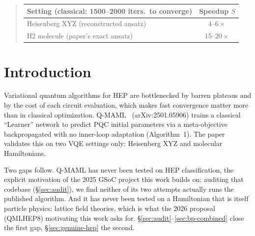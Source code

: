 \documentclass[11pt]{article}
\begin{document}
\begin{abstract}
\medskip
\centering\small
\begin{tabular}{lc}
\toprule
Setting (classical: 1500--2000 iters.\ to converge) & Speedup $S$ \\
\midrule
Heisenberg XYZ (reconstructed ansatz) & $4$--$6\times$ \\
H2 molecule (paper's exact ansatz) & $15$--$20\times$ \\
\bottomrule
\end{tabular}
\end{abstract}

\section{Introduction}

Variational quantum algorithms for HEP are bottlenecked by barren plateaus and by the cost of each circuit
evaluation, which makes fast convergence matter more than in classical optimization. Q-MAML~\citep{leeqmaml2025}
(arXiv:2501.05906) trains a classical ``Learner'' network to predict PQC initial parameters via a
meta-objective backpropagated with no inner-loop adaptation (Algorithm~1). The paper validates this on two
VQE settings only: Heisenberg XYZ and molecular Hamiltonians.

Two gaps follow. Q-MAML has never been tested on HEP classification, the explicit motivation of the 2025
GSoC project this work builds on: auditing that codebase (\S\ref{sec:audit}), we find neither of its two
attempts actually runs the published algorithm. And it has never been tested on a Hamiltonian that is itself
particle physics: lattice field theories, which is what the 2026 proposal (QMLHEP8) motivating this work
asks for. \S\ref{sec:audit}--\ref{sec:bp-combined} close the first gap, \S\ref{sec:genuine-hep} the second.
\end{document}
